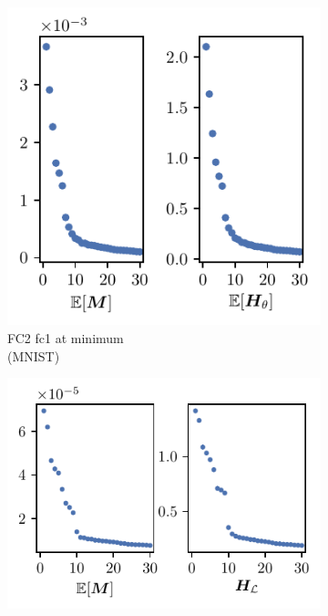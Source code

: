 \begin{figure}[th]
    \centering
    \begin{subfigure}[b]{0.33\textwidth}
        \centering
        \captionsetup{justification=centering}
        \includegraphics[width=\textwidth]{Figures/EM_vs_H/FC2_MNIST/UTAU_vs_full_sigval_d30_MNIST_Exp1_FC2_fixlr0.01R1_E-1_fc1.pdf}
        \caption{FC2 fc1 at minimum\\(MNIST)}
        \label{fig:UTAU_H_spec_FC2}
    \end{subfigure}%
    \begin{subfigure}[b]{0.33\textwidth}
        \centering
        \captionsetup{justification=centering}
        \includegraphics[width=\textwidth]{Figures/EM_vs_H/LeNet5_fixlr0.01/UTAU_vs_full_sigval_d30_CIFAR10_Exp1_LeNet5_fixlr0.01R1_E-1_fc1.pdf}

\end{subfigure}
\end{figure}
